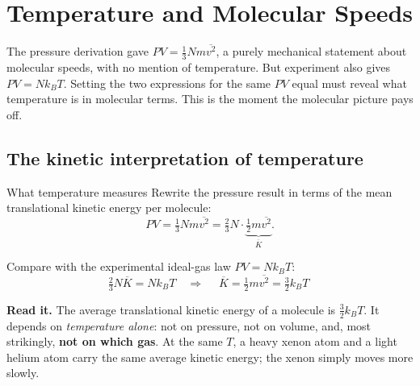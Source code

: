 \section{Temperature and Molecular Speeds}\label{sec:kttemperature}

The pressure derivation gave $PV = \tfrac13 Nm\overline{v^2}$, a purely mechanical statement about
molecular speeds, with no mention of temperature. But experiment also gives $PV = Nk_BT$. Setting the
two expressions for the same $PV$ equal must reveal what temperature is in molecular terms. This is the
moment the molecular picture pays off.

\subsection{The kinetic interpretation of temperature}

\begin{derivbox}{What temperature measures}
 Rewrite the pressure result in terms of the mean translational kinetic energy per molecule:
\[
PV = \tfrac13 Nm\overline{v^2} = \tfrac23 N\cdot\underbrace{\tfrac12 m\overline{v^2}}_{\overline K}.
\]

 Compare with the experimental ideal-gas law $PV = Nk_BT$:
\[
\tfrac23 N\overline K = Nk_BT
\quad\Longrightarrow\quad
\boxed{\;\overline K = \tfrac12 m\overline{v^2} = \tfrac32 k_B T\;}
\]

 \textbf{Read it.} The average translational kinetic energy of a molecule is $\tfrac32k_BT$. It
depends on \emph{temperature alone}: not on pressure, not on volume, and, most strikingly, \textbf{not on
which gas}. At the same $T$, a heavy xenon atom and a light helium atom carry the same average kinetic
energy; the xenon simply moves more slowly.
\end{derivbox}


